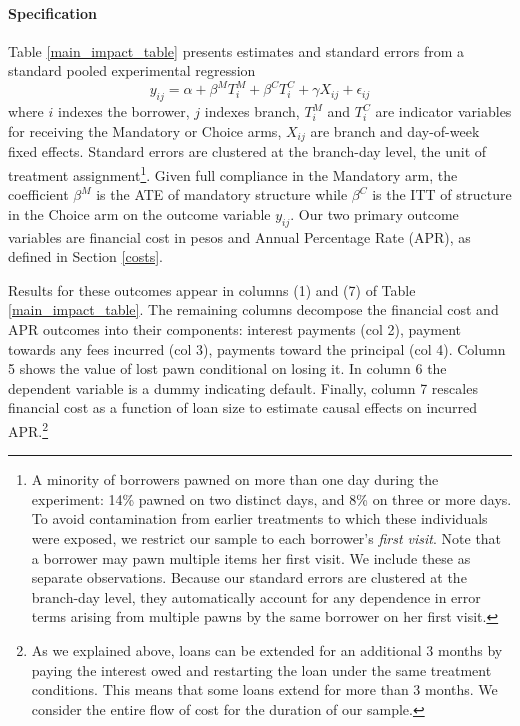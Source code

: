\documentclass[12pt, a4paper, colorinlistoftodos]{article}
\begin{document}

\paragraph*{Specification} Table \ref{main_impact_table} presents estimates and standard errors from a standard pooled experimental regression 
\begin{equation} \label{basic_reg}
    y_{ij} = \alpha + \beta^M T_{i}^M + \beta^C T_{i}^C + \gamma X_{ij} + \epsilon_{ij}
\end{equation}
where $i$ indexes the borrower, $j$ indexes branch, $T_{i}^M$ and $T_{i}^C$ are indicator variables for receiving the Mandatory or Choice arms, $X_{ij}$ are branch and day-of-week fixed effects. Standard errors are clustered at the branch-day level, the unit of treatment assignment\footnote{A minority of borrowers pawned on more than one day during the experiment: 14\% pawned on two distinct days, and 8\% on three or more days. To avoid contamination from earlier treatments to which these individuals were exposed, we restrict our sample to each borrower's \emph{first visit}. Note that a borrower may pawn multiple items her first visit. We include these as separate observations. Because our standard errors are clustered at the branch-day level, they automatically account for any dependence in error terms arising from multiple pawns by the same borrower on her first visit.}.
Given full compliance in the Mandatory arm, the coefficient $\beta^M$ is the ATE of mandatory structure while $\beta^C$ is the ITT of structure in the Choice arm on the outcome variable $y_{ij}$.
Our two primary outcome variables are financial cost in pesos and Annual Percentage Rate (APR), as defined in Section \ref{costs}. 


Results for these outcomes appear in columns (1) and (7) of Table \ref{main_impact_table}.
The remaining columns decompose the financial cost and APR outcomes into their components: interest payments (col 2), payment towards any fees incurred (col 3), payments toward the principal (col 4). Column 5 shows the value of lost pawn conditional on losing it.  In column 6 the dependent variable is a dummy indicating default.  Finally, column 7 rescales financial cost as a function of loan size to estimate causal effects on incurred APR.\footnote{As we explained above, loans can be extended for an additional 3 months by paying the interest owed and restarting the loan under the same treatment conditions. This means that some loans extend for more than 3 months. We consider the entire flow of cost for the duration of our sample.}  
\end{document}
